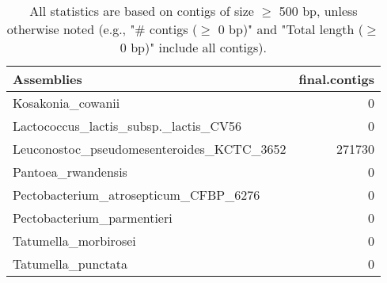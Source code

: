 \documentclass[12pt,a4paper]{article}
\begin{document}
\begin{table}[ht]
\begin{center}
\caption{All statistics are based on contigs of size $\geq$ 500 bp, unless otherwise noted (e.g., "\# contigs ($\geq$ 0 bp)" and "Total length ($\geq$ 0 bp)" include all contigs).}
\begin{tabular}{|l*{1}{|r}|}
\hline
Assemblies & final.contigs \\ \hline
Kosakonia\_cowanii & 0 \\ \hline
Lactococcus\_lactis\_subsp.\_lactis\_CV56 & 0 \\ \hline
Leuconostoc\_pseudomesenteroides\_KCTC\_3652 & 271730 \\ \hline
Pantoea\_rwandensis & 0 \\ \hline
Pectobacterium\_atrosepticum\_CFBP\_6276 & 0 \\ \hline
Pectobacterium\_parmentieri & 0 \\ \hline
Tatumella\_morbirosei & 0 \\ \hline
Tatumella\_punctata & 0 \\ \hline
\end{tabular}
\end{center}
\end{table}
\end{document}
